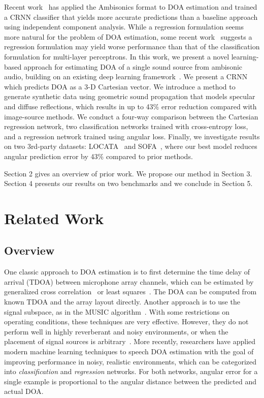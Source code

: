 \documentclass[a4paper]{article}
\begin{document}
Recent work~\cite{perotin2018crnn} has applied the Ambisonics format to DOA estimation and trained a CRNN classifier that yields more accurate predictions than a baseline approach using independent component analysis. While a regression formulation seems more natural for the problem of DOA estimation, some recent work~\cite{xiao2015learning} suggests a regression formulation may yield worse performance than that of the classification formulation for multi-layer perceptrons. In this work, we present a novel learning-based approach for estimating DOA of a single sound source from ambisonic audio, building on an existing deep learning framework~\cite{perotin2018crnn}. We present a CRNN which predicts DOA as a 3-D Cartesian vector. We introduce a method to generate synthetic data using geometric sound propagation that models specular and diffuse reflections, which results in up to 43\% error reduction compared with image-source methods. We conduct a four-way comparison between the Cartesian regression network, two classification networks trained with cross-entropy loss, and a regression network trained using angular loss. Finally, we investigate results on two 3rd-party datasets: LOCATA~\cite{LOCATA2018a} and SOFA~\cite{perez2018ambisonics}, where our best model reduces angular prediction error by 43\% compared to prior methods.

Section 2 gives an overview of prior work. We propose our method in Section 3. Section 4 presents our results on two benchmarks and we conclude in Section 5.
%
 \section{Related Work}
\subsection{Overview}
One classic approach to DOA estimation is to first determine the time delay of arrival (TDOA) between microphone array channels, which can be estimated by generalized cross correlation~\cite{knapp1976gcc} or least squares~\cite{huang2001ls}. The DOA can be computed from known TDOA and the array layout directly. Another approach is to use the signal subspace, as in the MUSIC algorithm~\cite{schmidt1986music}. With some restrictions on operating conditions, these techniques are very effective. However, they do not perform well in highly reverberant and noisy environments, or when the placement of signal sources is arbitrary~\cite{dibiase2001robust}. More recently, researchers have applied modern machine learning techniques to speech DOA estimation with the goal of improving performance in noisy, realistic environments, which can be categorized into \emph{classification} and \emph{regression} networks. For both networks, angular error for a single example is proportional to the angular distance between the predicted and actual DOA.
\end{document}
